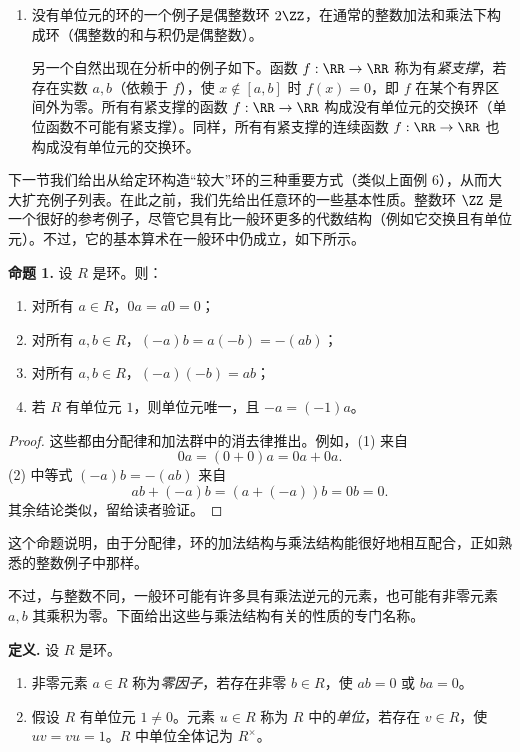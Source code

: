\begin{enumerate}[label=(\arabic*)]
  如果 $X$ 与 $A$ 有更多结构，还可形成尊重这些结构的函数环。例如，若 $A=\RR$，且 $X=[0,1]$ 是 $\RR$ 中闭区间，则所有从 $[0,1]$ 到 $\RR$ 的连续函数构成一个带 $1$ 的交换环（这需要基本极限定理保证连续函数之和与积仍连续）。
  \item 没有单位元的环的一个例子是偶整数环 $2\ZZ$，在通常的整数加法和乘法下构成环（偶整数的和与积仍是偶整数）。

  另一个自然出现在分析中的例子如下。函数 $f:\RR\to\RR$ 称为有\emph{紧支撑}，若存在实数 $a,b$（依赖于 $f$），使 $x\notin[a,b]$ 时 $f(x)=0$，即 $f$ 在某个有界区间外为零。所有有紧支撑的函数 $f:\RR\to\RR$ 构成没有单位元的交换环（单位函数不可能有紧支撑）。同样，所有有紧支撑的连续函数 $f:\RR\to\RR$ 也构成没有单位元的交换环。
\end{enumerate}

下一节我们给出从给定环构造“较大”环的三种重要方式（类似上面例 6），从而大大扩充例子列表。在此之前，我们先给出任意环的一些基本性质。整数环 $\ZZ$ 是一个很好的参考例子，尽管它具有比一般环更多的代数结构（例如它交换且有单位元）。不过，它的基本算术在一般环中仍成立，如下所示。

\medskip
\noindent\textbf{命题 1.} 设 $R$ 是环。则：
\begin{enumerate}[label=(\arabic*)]
  \item 对所有 $a\in R$，$0a=a0=0$；
  \item 对所有 $a,b\in R$，$(-a)b=a(-b)=-(ab)$；
  \item 对所有 $a,b\in R$，$(-a)(-b)=ab$；
  \item 若 $R$ 有单位元 $1$，则单位元唯一，且 $-a=(-1)a$。
\end{enumerate}

\begin{proof}
这些都由分配律和加法群中的消去律推出。例如，(1) 来自
\[
  0a=(0+0)a=0a+0a.
\]
(2) 中等式 $(-a)b=-(ab)$ 来自
\[
  ab+(-a)b=(a+(-a))b=0b=0.
\]
其余结论类似，留给读者验证。
\end{proof}

这个命题说明，由于分配律，环的加法结构与乘法结构能很好地相互配合，正如熟悉的整数例子中那样。

不过，与整数不同，一般环可能有许多具有乘法逆元的元素，也可能有非零元素 $a,b$ 其乘积为零。下面给出这些与乘法结构有关的性质的专门名称。

\medskip
\noindent\textbf{定义.} 设 $R$ 是环。
\begin{enumerate}[label=(\arabic*)]
  \item 非零元素 $a\in R$ 称为\emph{零因子}，若存在非零 $b\in R$，使 $ab=0$ 或 $ba=0$。
  \item 假设 $R$ 有单位元 $1\neq0$。元素 $u\in R$ 称为 $R$ 中的\emph{单位}，若存在 $v\in R$，使 $uv=vu=1$。$R$ 中单位全体记为 $R^\times$。
\end{enumerate}

